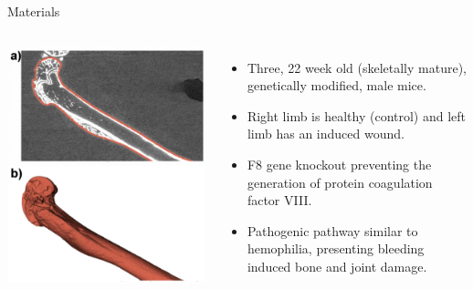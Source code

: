 \documentclass[10pt,aspectratio=169]{beamer}
\begin{document}
\begin{frame}[fragile]{Materials}
\begin{columns}[onlytextwidth]
    \centering
    \includegraphics[width=0.99\textwidth]{figures/bone_materials_femur_highlight.png}\\
    \vspace{0.5cm}
    \includegraphics[width=0.99\textwidth]{figures/bone_materials_femur_3D.png}
    \centering
    \begin{itemize} \itemsep1em
        \item Three, 22 week old (skeletally mature), genetically modified, male mice.
        \item Right limb is healthy (control) and left limb has an induced wound.
        \item F8 gene knockout preventing the generation of protein coagulation factor VIII.
        \item Pathogenic pathway similar to hemophilia, presenting bleeding induced bone and joint damage.
    \end{itemize}
\end{columns}
\end{frame}
\end{document}
